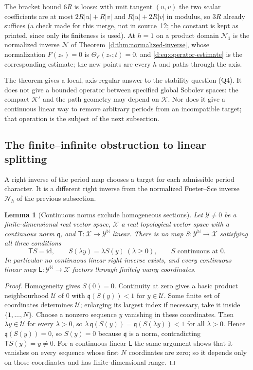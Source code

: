 \documentclass[11pt,a4paper]{article}
\numberwithin{equation}{section}
\newtheorem{lemma}[theorem]{Lemma}
\theoremstyle{definition}
\theoremstyle{remark}
\theoremstyle{plain}
\newcommand{\abs}[1]{\lvert #1\rvert}
\newcommand{\Herm}{\Theta}                        %
\begin{document}
The bracket bound $6R$ is loose: with unit tangent $(u,v)$ the two scalar
coefficients are at most $2R\abs u+R\abs v$ and $R\abs u+2R\abs v$ in modulus,
so $3R$ already suffices (a check made for this merge, not in source~12; the
constant is kept as printed, since only its finiteness is used). At $h=1$ on a
product domain $\mathcal N_1$ is the normalized inverse $\mathcal N$ of
Theorem~\ref{d:thm:normalized-inverse}, whose normalization $F(z_*)=0$ is
$\Herm_F(z_*;t)=0$, and \eqref{d:eq:operator-estimate} is the corresponding
estimate; the new points are every $h$ and paths through the axis.

The theorem gives a local, axis-regular answer to the stability question (Q4).
It does not give a bounded operator between specified global Sobolev spaces:
the compact $\mathcal K'$ and the path geometry may depend on $\mathcal K$. Nor
does it give a continuous linear way to remove arbitrary periods from an
incompatible target; that operation is the subject of the next subsection.

\subsection{The finite--infinite obstruction to linear splitting}
\label{h:sec:nonsplit}

A right inverse of the period map chooses a target for each admissible period
character. It is a different right inverse from the normalized Fueter--Sce
inverse $\mathcal N_h$ of the previous subsection.

\begin{lemma}[Continuous norms exclude homogeneous sections]
\label{h:lem:no-section}
Let $\mathcal Y\ne0$ be a finite-dimensional real vector space, $\mathcal X$ a
real topological vector space with a continuous norm $\mathfrak q$, and
$\mathsf T:\mathcal X\to\mathcal Y^{\mathbb N}$ linear. There is no map
$S:\mathcal Y^{\mathbb N}\to\mathcal X$ satisfying all three conditions
\[
 \mathsf TS=\mathrm{id},\qquad S(\lambda y)=\lambda S(y)\ (\lambda\ge0),\qquad
 S\text{ continuous at }0 .
\]
In particular no continuous linear right inverse exists, and every continuous
linear map $\mathsf L:\mathcal Y^{\mathbb N}\to\mathcal X$ factors through
finitely many coordinates.
\end{lemma}

\begin{proof}
Homogeneity gives $S(0)=0$. Continuity at zero gives a basic product
neighbourhood $\mathcal U$ of $0$ with $\mathfrak q(S(y))<1$ for $y\in\mathcal
U$. Some finite set of coordinates determines $\mathcal U$; enlarging its
largest index if necessary, take it inside $\{1,\dots,N\}$. Choose a nonzero
sequence $y$ vanishing in these coordinates. Then $\lambda y\in\mathcal U$ for
every $\lambda>0$, so $\lambda\,\mathfrak q(S(y))=\mathfrak q(S(\lambda y))<1$
for all $\lambda>0$. Hence $\mathfrak q(S(y))=0$, so $S(y)=0$ because
$\mathfrak q$ is a norm, contradicting $\mathsf TS(y)=y\ne0$. For a continuous
linear $\mathsf L$ the same argument shows that it vanishes on every sequence
whose first $N$ coordinates are zero; so it depends only on those coordinates
and has finite-dimensional range.
\end{proof}
\end{document}
